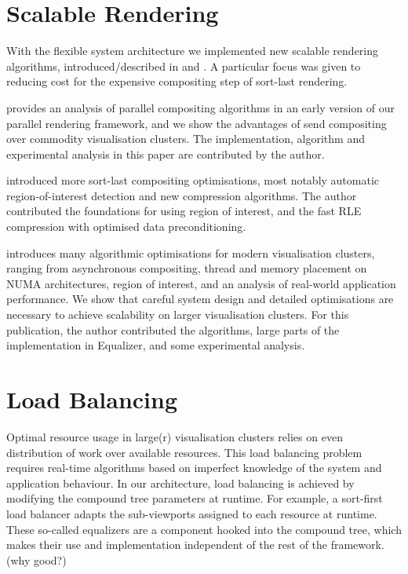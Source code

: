 \section{Scalable Rendering}

With the flexible system architecture we implemented new scalable rendering
algorithms, introduced/described in \cite{EMP:09} and \cite{ESP:18}. A particular focus
was given to reducing cost for the expensive compositing step of sort-last
rendering.

\cite{EP:07} provides an analysis of parallel compositing algorithms in an
early version of our parallel rendering framework, and we show the advantages of send
compositing over commodity visualisation clusters. The
implementation, algorithm and experimental analysis in this paper are
contributed by the author.

\cite{MEP:10} introduced more sort-last compositing optimisations, most notably
automatic region-of-interest detection and new compression algorithms. The
author contributed the foundations for using region of interest, and the fast
RLE compression with optimised data preconditioning.

\cite{EBAHMP:12} introduces many algorithmic optimisations for modern
visualisation clusters, ranging from asynchronous compositing, thread and
memory placement on NUMA architectures, region of interest, and an analysis of
real-world application performance. We show that careful system design and
detailed optimisations are necessary to achieve scalability on larger
visualisation clusters. For this publication, the author contributed the
algorithms, large parts of the implementation in Equalizer, and some
experimental analysis.

\section{Load Balancing}

Optimal resource usage in large(r) visualisation clusters relies on even
distribution of work over available resources. This load balancing problem
requires real-time algorithms based on imperfect knowledge of the system and
application behaviour. In our architecture, load balancing is achieved by modifying
the compound tree parameters at runtime. For example, a sort-first load balancer
adapts the sub-viewports assigned to each resource at runtime. These so-called
\textsf{equalizers} are a component hooked into the compound tree, which makes
their use and implementation independent of the rest of the framework. (why good?)

